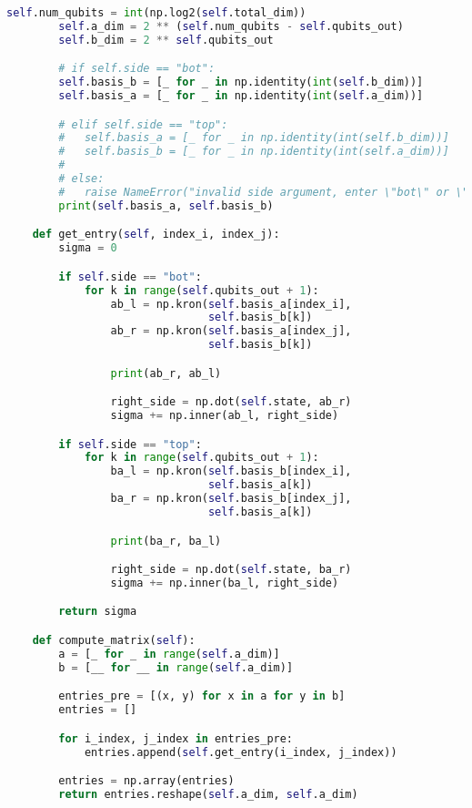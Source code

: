 \begin{lstlisting}[language=Python, caption=Funcions varies]
		self.num_qubits = int(np.log2(self.total_dim))
		self.a_dim = 2 ** (self.num_qubits - self.qubits_out)
		self.b_dim = 2 ** self.qubits_out

		# if self.side == "bot":
		self.basis_b = [_ for _ in np.identity(int(self.b_dim))]
		self.basis_a = [_ for _ in np.identity(int(self.a_dim))]

		# elif self.side == "top":
		#	self.basis_a = [_ for _ in np.identity(int(self.b_dim))]
		#	self.basis_b = [_ for _ in np.identity(int(self.a_dim))]
		#
		# else:
		#	raise NameError("invalid side argument, enter \"bot\" or \"top\"")
		print(self.basis_a, self.basis_b)

	def get_entry(self, index_i, index_j):
		sigma = 0

		if self.side == "bot":
			for k in range(self.qubits_out + 1):
				ab_l = np.kron(self.basis_a[index_i],
						   	   self.basis_b[k])
				ab_r = np.kron(self.basis_a[index_j],
						   	   self.basis_b[k])

				print(ab_r, ab_l)

				right_side = np.dot(self.state, ab_r)
				sigma += np.inner(ab_l, right_side)

		if self.side == "top":
			for k in range(self.qubits_out + 1):
				ba_l = np.kron(self.basis_b[index_i],
							   self.basis_a[k])
				ba_r = np.kron(self.basis_b[index_j],
							   self.basis_a[k])

				print(ba_r, ba_l)

				right_side = np.dot(self.state, ba_r)
				sigma += np.inner(ba_l, right_side)

		return sigma

	def compute_matrix(self):
		a = [_ for _ in range(self.a_dim)]
		b = [__ for __ in range(self.a_dim)]

		entries_pre = [(x, y) for x in a for y in b]
		entries = []

		for i_index, j_index in entries_pre:
			entries.append(self.get_entry(i_index, j_index))

		entries = np.array(entries)
		return entries.reshape(self.a_dim, self.a_dim)

\end{lstlisting}


